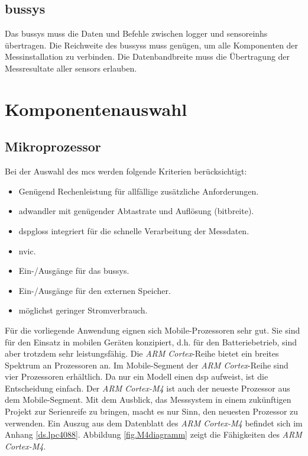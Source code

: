 \subsection{\gls{bussys}}
Das \gls{bussys} muss die Daten und Befehle zwischen \gls{logger} und \glspl{sensoreinh} übertragen. Die Reichweite des \gls{bussys}s muss genügen, um alle Komponenten der Messinstallation zu verbinden. Die Datenbandbreite muss die Übertragung der Messresultate aller \glspl{sensor} erlauben.


\section{Komponentenauswahl}

\subsection{Mikroprozessor}
Bei der Auswahl des \gls{mc}s werden folgende Kriterien berücksichtigt:

\begin{itemize}
\item Genügend Rechenleistung für allfällige zusätzliche Anforderungen.
\item \gls{adwandler} mit genügender Abtastrate und Auflösung (\gls{bitbreite}).
\item \gls{dspgloss} integriert für die schnelle Verarbeitung der Messdaten.
\item \gls{nvic}.
\item Ein-/Ausgänge für das \gls{bussys}.
\item Ein-/Ausgänge für den externen Speicher.
\item möglichst geringer Stromverbrauch.
\end{itemize}

Für die vorliegende Anwendung eignen sich Mobile-Prozessoren sehr gut. Sie sind für den Einsatz in mobilen Geräten konzipiert, d.h. für den Batteriebetrieb, sind aber trotzdem sehr leistungsfähig. Die \emph{ARM Cortex}-Reihe bietet ein breites Spektrum an Prozessoren an. Im Mobile-Segment der \emph{ARM Cortex}-Reihe sind vier Prozessoren erhältlich. Da nur ein Modell einen \gls{dsp} aufweist, ist die Entscheidung einfach. Der \emph{ARM Cortex-M4} ist auch der neueste Prozessor aus dem Mobile-Segment. Mit dem Ausblick, das Messsystem in einem zukünftigen Projekt zur Serienreife zu bringen, macht es nur Sinn, den neuesten Prozessor zu verwenden. Ein Auszug aus dem Datenblatt des \emph{ARM Cortex-M4} befindet sich im Anhang \ref{ds.lpc4088}. Abbildung \ref{fig.M4diagramm} zeigt die Fähigkeiten des \emph{ARM Cortex-M4}.

